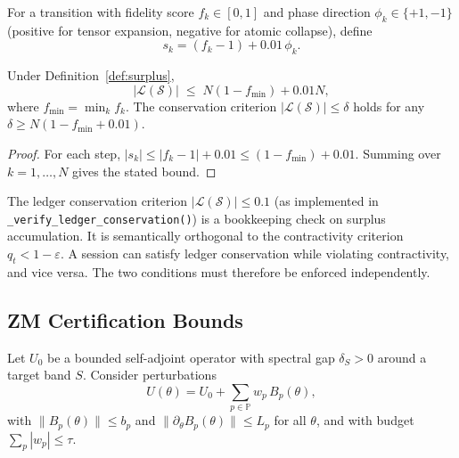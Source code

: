 \documentclass[11pt]{article}
\begin{document}
\begin{definition}
\label{def:surplus}
For a transition with fidelity score $f_{k}\in[0,1]$
and phase direction $\phi_{k}\in\{+1,-1\}$
(positive for tensor expansion, negative for atomic collapse),
define
\[
s_{k} = (f_{k}-1) + 0.01\,\phi_{k}.
\]
\end{definition}

\begin{proposition}
\label{prop:ledgercons}
Under Definition~\ref{def:surplus},
\[
|\mathcal{L}(\mathcal{S})| \;\leq\; N(1-f_{\min}) + 0.01N,
\]
where $f_{\min}=\min_{k}f_{k}$.
The conservation criterion $|\mathcal{L}(\mathcal{S})|\leq\delta$
holds for any $\delta\geq N(1-f_{\min}+0.01)$.
\end{proposition}

\begin{proof}
For each step, $|s_{k}|\leq|f_{k}-1|+0.01\leq(1-f_{\min})+0.01$.
Summing over $k=1,\dots,N$ gives the stated bound.
\end{proof}

\begin{remark}
\label{rem:ledger}
The ledger conservation criterion
$|\mathcal{L}(\mathcal{S})|\leq 0.1$
(as implemented in \texttt{\_verify\_ledger\_conservation()})
is a bookkeeping check on surplus accumulation.
It is semantically orthogonal to the contractivity criterion
$q_{t}<1-\varepsilon$.
A session can satisfy ledger conservation while violating
contractivity, and vice versa.
The two conditions must therefore be enforced independently.
\end{remark}

\subsection{ZM Certification Bounds}
\label{sec:ZM}

\begin{definition}
\label{def:budget}
Let $U_{0}$ be a bounded self-adjoint operator with
spectral gap $\delta_{S}>0$ around a target band $S$.
Consider perturbations
\[
U(\theta) = U_{0} + \sum_{p\in\mathbb{P}} w_{p}\,B_{p}(\theta),
\]
with $\|B_{p}(\theta)\|\leq b_{p}$ and
$\|\partial_{\theta}B_{p}(\theta)\|\leq L_{p}$
for all $\theta$, and with budget $\sum_{p}|w_{p}|\leq \tau$.
\end{definition}
\end{document}
